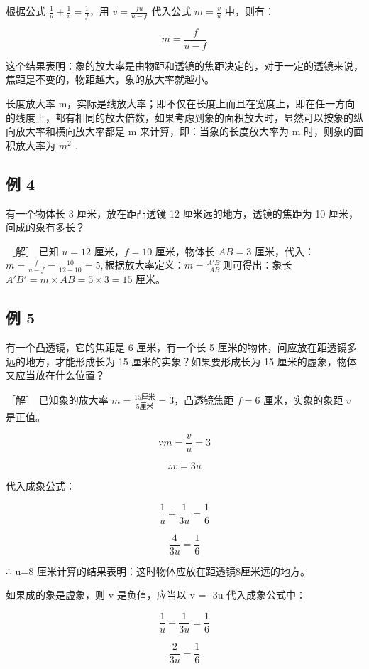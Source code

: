 根据公式 \(\frac{1}{u} + \frac{1}{v} = \frac{1}{f}\)，用
\(v = \frac{fu}{u - f}\) 代入公式 \(m = \frac{v}{u}\) 中，则有：

\[
m = \frac {f}{u - f}
\]

这个结果表明：象的放大率是由物距和透镜的焦距决定的，对于一定的透镜来说，焦距是不变的，物距越大，象的放大率就越小。

长度放大率
m，实际是线放大率；即不仅在长度上而且在宽度上，即在任一方向的线度上，都有相同的放大倍数，如果考虑到象的面积放大时，显然可以按象的纵向放大率和横向放大率都是
m 来计算，即：当象的长度放大率为 m 时，则象的面积放大率为 \(m^{2}\) .

\subsection{例 4}

有一个物体长 3 厘米，放在距凸透镜 12 厘米远的地方，透镜的焦距为 10
厘米，问成的象有多长？

［解］ 已知 \(u = 12\) 厘米，\(f = 10\) 厘米，物体长 \(AB = 3\)
厘米，代入：\(m = \frac{f}{u - f} = \frac{10}{12 - 10} = 5,\)根据放大率定义：\(m=\frac{A'B'}{AB}\)则可得出：象长
\(A'B' = m \times AB = 5 \times 3 = 15\) 厘米。

\subsection{例 5}

有一个凸透镜，它的焦距是 6 厘米，有一个长 5
厘米的物体，问应放在距透镜多远的地方，才能形成长为 15
厘米的实象？如果要形成长为 15 厘米的虚象，物体又应当放在什么位置？

［解］ 已知象的放大率
\(m = \frac{15\text{厘米}}{5\text{厘米}} = 3\)，凸透镜焦距 \(f = 6\)
厘米，实象的象距 \(v\) 是正值。

\[
\because m = \frac {v}{u} = 3
\]

\[
\therefore v = 3 u
\]

代入成象公式：

\[
\frac {1}{u} + \frac {1}{3 u} = \frac {1}{6}
\]

\[
\frac {4}{3 u} = \frac {1}{6}
\]

∴ u=8 厘米计算的结果表明：这时物体应放在距透镜8厘米远的地方。

如果成的象是虚象，则 v 是负值，应当以 v = -3u 代入成象公式中：

\[
\frac {1}{u} - \frac {1}{3 u} = \frac {1}{6}
\]

\[
\frac {2}{3 u} = \frac {1}{6}
\]

